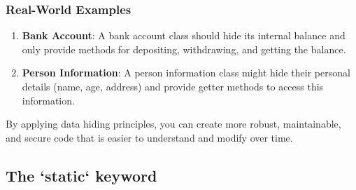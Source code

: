 \documentclass{book}
\begin{document}
\subsubsection{Real-World Examples}

\begin{enumerate}
	\item \textbf{Bank Account}: A bank account class should hide its internal balance and only provide methods for depositing, withdrawing, and getting the balance.
	\item \textbf{Person Information}: A person information class might hide their personal details (name, age, address) and provide getter methods to access this information.
\end{enumerate}

By applying data hiding principles, you can create more robust, maintainable, and secure code that is easier to understand and modify over time.
\subsection{The `static` keyword}
\end{document}
